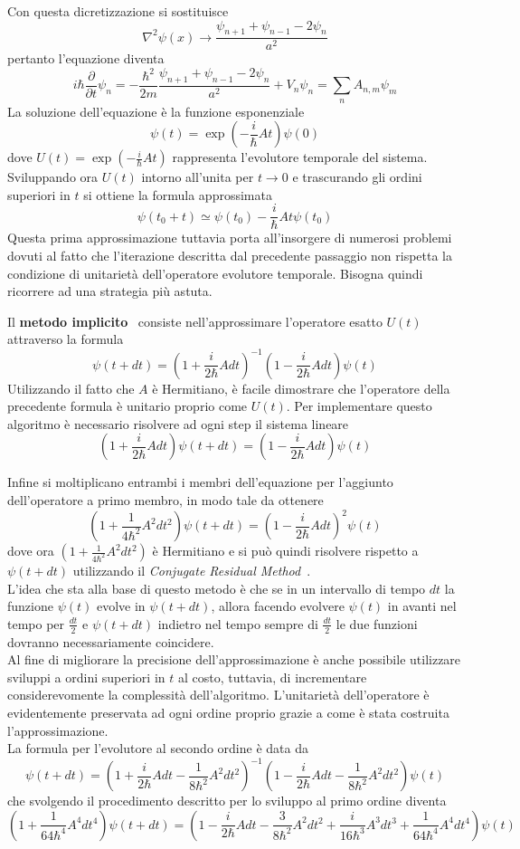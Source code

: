 Con questa dicretizzazione si sostituisce
$$\nabla^2\psi(x) \rightarrow \frac{\psi_{n+1}+\psi_{n-1}-2\psi_n}{a^2} $$
pertanto l'equazione diventa
$$i\hbar\frac{\partial}{\partial t} \psi_n = -\frac{\hbar^2}{2m}\frac{\psi_{n+1}+\psi_{n-1}-2\psi_n}{a^2} + V_n\psi_n = \sum\limits_{n}A_{n,m}\psi_m$$
La soluzione dell'equazione è la funzione esponenziale
$$\psi(t)=\exp\left(-\frac{i}{\hbar}At\right)\psi(0)$$
dove $U(t) = \exp(-\frac{i}{\hbar}At)$ rappresenta l'evolutore temporale del sistema. Sviluppando ora $U(t)$ intorno all'unita per $t\rightarrow 0$ e trascurando gli ordini superiori in $t$ si ottiene la formula approssimata
$$\psi(t_0+t)\simeq\psi(t_0)-\frac{i}{\hbar}At\psi(t_0)$$
Questa prima approssimazione tuttavia porta all'insorgere di numerosi problemi dovuti al fatto che l'iterazione descritta dal precedente passaggio non rispetta la condizione di unitarietà dell'operatore evolutore temporale. Bisogna quindi ricorrere ad una strategia più astuta.

Il \textbf{metodo implicito}~\cite{cinque} consiste nell'approssimare l'operatore esatto $U(t)$ attraverso la formula
$$\psi(t+dt)=(1+\frac{i}{2\hbar}Adt)^{-1}(1-\frac{i}{2\hbar}Adt)\psi(t)$$
Utilizzando il fatto che $A$ è Hermitiano, è facile dimostrare che l'operatore della precedente formula è unitario proprio come $U(t)$.
Per implementare questo algoritmo è necessario risolvere ad ogni step il sistema lineare
$$(1+\frac{i}{2\hbar}Adt)\psi(t+dt)=(1-\frac{i}{2\hbar}Adt)\psi(t)$$

Infine si moltiplicano entrambi i membri dell'equazione per l'aggiunto dell'operatore a primo membro, in modo tale da ottenere
$$(1+\frac{1}{4\hbar^2}A^2dt^2)\psi(t+dt)=(1-\frac{i}{2\hbar}Adt)^2\psi(t)$$
dove ora $(1+\frac{1}{4\hbar^2}A^2dt^2)$ è Hermitiano e si può quindi risolvere rispetto a $\psi(t+dt)$ utilizzando il \textit{Conjugate Residual Method}~\cite{tre}.\\

L'idea che sta alla base di questo metodo è che se in un intervallo di tempo $dt$ la funzione $\psi(t)$ evolve in $\psi(t+dt)$, allora facendo evolvere $\psi(t)$ in avanti nel tempo per $\frac{dt}{2}$ e $\psi(t+dt)$ indietro nel tempo sempre di $\frac{dt}{2}$ le due funzioni dovranno necessariamente coincidere.
\\

Al fine di migliorare la precisione dell'approssimazione è anche possibile utilizzare sviluppi a ordini superiori in $t$ al costo, tuttavia, di incrementare considerevomente la complessità dell'algoritmo. L'unitarietà dell'operatore è evidentemente preservata ad ogni ordine proprio grazie a come è stata costruita l'approssimazione.
\\

La formula per l'evolutore al secondo ordine è data da
$$\psi(t+dt)=\left(1+\frac{i}{2\hbar}Adt-\frac{1}{8\hbar^2}A^2dt^2\right)^{-1}\left(1-\frac{i}{2\hbar}Adt-\frac{1}{8\hbar^2}A^2dt^2\right)\psi(t)$$
che svolgendo il procedimento descritto per lo sviluppo al primo ordine diventa
$$\left(1+\frac{1}{64\hbar^4}A^4dt^4\right)\psi(t+dt)=\left(1-\frac{i}{2\hbar}Adt-\frac{3}{8\hbar^2}A^2dt^2+\frac{i}{16\hbar^3}A^3dt^3+\frac{1}{64\hbar^4}A^4dt^4\right)\psi(t)$$

